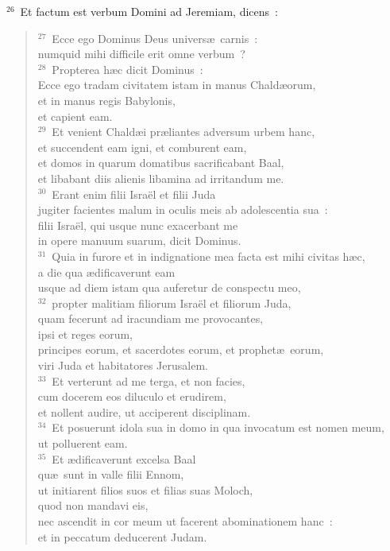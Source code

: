 ${}^{26}$~Et factum est verbum Domini ad Jeremiam, dicens~:
\begin{verse}${}^{27}$~Ecce ego Dominus Deus univers\ae\ carnis~:\\ numquid mihi difficile erit omne verbum~?\\
${}^{28}$~Propterea h\ae c dicit Dominus~:\\ Ecce ego tradam civitatem istam in manus Chald\ae orum,\\ et in manus regis Babylonis,\\ et capient eam.\\
${}^{29}$~Et venient Chald\ae i pr\ae liantes adversum urbem hanc,\\ et succendent eam igni, et comburent eam,\\ et domos in quarum domatibus sacrificabant Baal,\\ et libabant diis alienis libamina ad irritandum me.\\
${}^{30}$~Erant enim filii Isra\"el et filii Juda\\ jugiter facientes malum in oculis meis ab adolescentia sua~:\\ filii Isra\"el, qui usque nunc exacerbant me\\ in opere manuum suarum, dicit Dominus.\\
${}^{31}$~Quia in furore et in indignatione mea facta est mihi civitas h\ae c,\\ a die qua \ae dificaverunt eam\\ usque ad diem istam qua auferetur de conspectu meo,\\
${}^{32}$~propter malitiam filiorum Isra\"el et filiorum Juda,\\ quam fecerunt ad iracundiam me provocantes,\\ ipsi et reges eorum,\\ principes eorum, et sacerdotes eorum, et prophet\ae\ eorum,\\ viri Juda et habitatores Jerusalem.\\
${}^{33}$~Et verterunt ad me terga, et non facies,\\ cum docerem eos diluculo et erudirem,\\ et nollent audire, ut acciperent disciplinam.\\
${}^{34}$~Et posuerunt idola sua in domo in qua invocatum est nomen meum,\\ ut polluerent eam.\\
${}^{35}$~Et \ae dificaverunt excelsa Baal\\ qu\ae\ sunt in valle filii Ennom,\\ ut initiarent filios suos et filias suas Moloch,\\ quod non mandavi eis,\\ nec ascendit in cor meum ut facerent abominationem hanc~:\\ et in peccatum deducerent Judam.\\

\end{verse}
